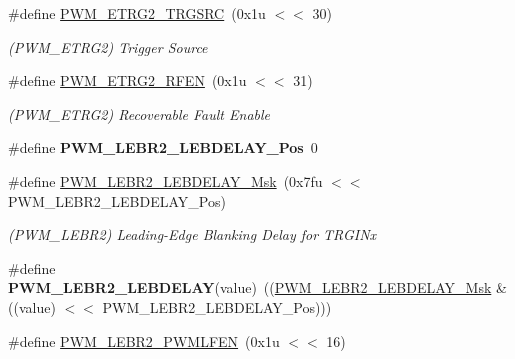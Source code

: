 \begin{DoxyCompactItemize}
\#define \mbox{\hyperlink{group__SAME70__PWM_ga4f0be694bd13e2e7e8638e7f3b96b631}{P\+W\+M\+\_\+\+E\+T\+R\+G2\+\_\+\+T\+R\+G\+S\+RC}}~(0x1u $<$$<$ 30)
\begin{DoxyCompactList}\small\item\em (P\+W\+M\+\_\+\+E\+T\+R\+G2) Trigger Source \end{DoxyCompactList}\item 
\mbox{\label{group__SAME70__PWM_gac1578b27277cba0582ea65c620ea5005}} 
\#define \mbox{\hyperlink{group__SAME70__PWM_gac1578b27277cba0582ea65c620ea5005}{P\+W\+M\+\_\+\+E\+T\+R\+G2\+\_\+\+R\+F\+EN}}~(0x1u $<$$<$ 31)
\begin{DoxyCompactList}\small\item\em (P\+W\+M\+\_\+\+E\+T\+R\+G2) Recoverable Fault Enable \end{DoxyCompactList}\item 
\mbox{\label{group__SAME70__PWM_ga081e1b637eb742c88f009c93b397f831}} 
\#define {\bfseries P\+W\+M\+\_\+\+L\+E\+B\+R2\+\_\+\+L\+E\+B\+D\+E\+L\+A\+Y\+\_\+\+Pos}~0
\item 
\mbox{\label{group__SAME70__PWM_ga6217bfce3c3d3fc7be8b1ebdbeee8a7b}} 
\#define \mbox{\hyperlink{group__SAME70__PWM_ga6217bfce3c3d3fc7be8b1ebdbeee8a7b}{P\+W\+M\+\_\+\+L\+E\+B\+R2\+\_\+\+L\+E\+B\+D\+E\+L\+A\+Y\+\_\+\+Msk}}~(0x7fu $<$$<$ P\+W\+M\+\_\+\+L\+E\+B\+R2\+\_\+\+L\+E\+B\+D\+E\+L\+A\+Y\+\_\+\+Pos)
\begin{DoxyCompactList}\small\item\em (P\+W\+M\+\_\+\+L\+E\+B\+R2) Leading-\/\+Edge Blanking Delay for T\+R\+G\+I\+Nx \end{DoxyCompactList}\item 
\mbox{\label{group__SAME70__PWM_ga3d193321d2e282e547e2cfbc15d344f0}} 
\#define {\bfseries P\+W\+M\+\_\+\+L\+E\+B\+R2\+\_\+\+L\+E\+B\+D\+E\+L\+AY}(value)~((\mbox{\hyperlink{group__SAMV71__PWM_ga6217bfce3c3d3fc7be8b1ebdbeee8a7b}{P\+W\+M\+\_\+\+L\+E\+B\+R2\+\_\+\+L\+E\+B\+D\+E\+L\+A\+Y\+\_\+\+Msk}} \& ((value) $<$$<$ P\+W\+M\+\_\+\+L\+E\+B\+R2\+\_\+\+L\+E\+B\+D\+E\+L\+A\+Y\+\_\+\+Pos)))
\item 
\mbox{\label{group__SAME70__PWM_ga6ed17098b3cf97e2d00a6198259e93a8}} 
\#define \mbox{\hyperlink{group__SAME70__PWM_ga6ed17098b3cf97e2d00a6198259e93a8}{P\+W\+M\+\_\+\+L\+E\+B\+R2\+\_\+\+P\+W\+M\+L\+F\+EN}}~(0x1u $<$$<$ 16)
$$
\end{DoxyCompactItemize}
